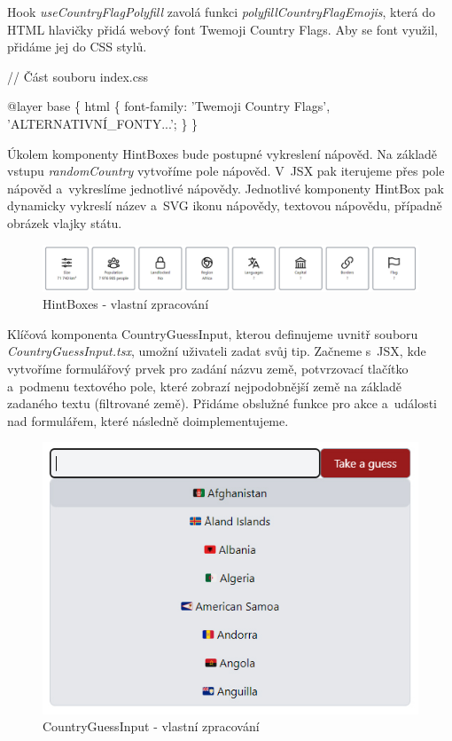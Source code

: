 Hook \emph{useCountryFlagPolyfill} zavolá funkci \emph{polyfillCountryFlagEmojis}, která do HTML hlavičky přidá webový font Twemoji Country Flags. Aby se font využil, přidáme jej do CSS stylů.

\begin{prog}
// Část souboru index.css

@layer base \{
  html \{
    font-family: 'Twemoji Country Flags', 'ALTERNATIVNÍ_FONTY...';
  \}
\}
\end{prog}

Úkolem komponenty HintBoxes bude postupné vykreslení nápověd. Na základě vstupu \emph{randomCountry} vytvoříme pole nápověd. V~JSX pak iterujeme přes pole nápověd a~vykreslíme jednotlivé nápovědy. 
Jednotlivé komponenty HintBox pak dynamicky vykreslí název a~SVG ikonu nápovědy, textovou nápovědu, případně obrázek vlajky státu.

\begin{figure}[htb]
	\centering
		\includegraphics[width=.97\textwidth]{images/HintBoxes.jpg}
	\caption[HintBoxes]{HintBoxes - vlastní zpracování}
	\label{fig:reacthintboxes}
\end{figure}

Klíčová komponenta CountryGuessInput, kterou definujeme uvnitř souboru \emph{CountryGuessInput.tsx}, umožní uživateli zadat svůj tip. 
Začneme s~JSX, kde vytvoříme formulářový prvek pro zadání názvu země, potvrzovací tlačítko a~podmenu textového pole, které zobrazí nejpodobnější země na základě zadaného textu (filtrované země). 
Přidáme obslužné funkce pro akce a~události nad formulářem, které následně doimplementujeme.

\begin{figure}[htb]
	\centering
		\includegraphics[width=.5\textwidth]{images/CountryGuessInput.jpg}
	\caption[CountryGuessInput]{CountryGuessInput - vlastní zpracování}
	\label{fig:reactcountryguessinput}
\end{figure}

